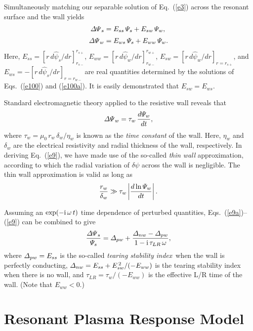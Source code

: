 \documentclass[12pt,prb,aps]{revtex4-1}
\begin{document}
Simultaneously matching our separable solution of Eq.~(\ref{e3})  across the resonant surface and the wall yields\,\cite{rf1993}
\begin{align}\label{e9a}
{\mit\Delta\Psi}_s& = E_{ss}\,{\mit\Psi}_s + E_{sw}\,{\mit\Psi}_w,\\[0.5ex]
{\mit\Delta\Psi}_w& = E_{ws}\,{\mit\Psi}_s+ E_{ww}\,{\mit\Psi}_w.
\end{align}
Here, $E_{ss}= [r\,d\hat{\psi}_s/dr]_{r_{s-}}^{r_{s+}}$,
$E_{ww}= [r\,d\hat{\psi}_w/dr]_{r_{w-}}^{r_{w+}}$,
$E_{sw} =[r\,{d\hat\psi}_w/dr]_{r=r_{s+}}$, and 
$E_{ws} =-[r\,{d\hat\psi}_s/dr]_{r=r_{w-}}$
are real quantities determined by the solutions of Eqs.~(\ref{e100}) and (\ref{e100a}).
It is easily demonstrated that 
$E_{sw} = E_{ws}$.\cite{rf1993}

Standard electromagnetic theory applied to the resistive wall reveals that\,\cite{nave,rf1993}
\begin{equation}\label{e9}
{\mit\Delta\Psi}_w = \tau_w\,\frac{d{\mit\Psi}_w}{dt},
\end{equation}
where
$\tau_w= \mu_0\,r_w\,\delta_w/\eta_w$ is known as the {\em time constant}\/ of the wall.
Here, $\eta_w$ and $\delta_w$ are the electrical resistivity and radial thickness  of the wall, respectively. 
In deriving Eq.~(\ref{e9}), we have made use of the so-called {\em thin wall}\/ approximation, according to
which the radial variation of $\delta\psi$ across the wall is negligible.  The thin wall approximation is
valid as long as
\begin{equation}\label{e10}
\frac{r_w}{\delta_w}\gg \tau_w\left|\frac{d\ln{\mit\Psi}_w}{dt}\right|.
\end{equation}

Assuming an $\exp(-{\rm i}\,\omega\,t)$ time dependence of perturbed quantities,  Eqs.~(\ref{e9a})--(\ref{e9}) 
can be combined to give
\begin{equation}\label{e11}
\frac{{\mit\Delta\Psi}_s}{{\mit\Psi}_s}= {\mit\Delta}_{pw} + \frac{{\mit\Delta}_{nw}-{\mit\Delta}_{pw}}{1-{\rm i}\,\tau_{LR}\,\omega},
\end{equation}
where ${\mit\Delta}_{pw}= E_{ss}$ is the  so-called {\em tearing stability index}\,\cite{fkr} when the wall is perfectly conducting,
${\mit\Delta}_{nw} = E_{ss} + E_{sw}^{\,2}/(-E_{ww})$ is the  tearing stability index when there is no wall,
and $\tau_{LR}= \tau_w/(-E_{ww})$ is the effective L/R time of the wall. (Note that $E_{ww}<0$.)

\section{Resonant Plasma Response Model}\label{sfour}
\end{document}
